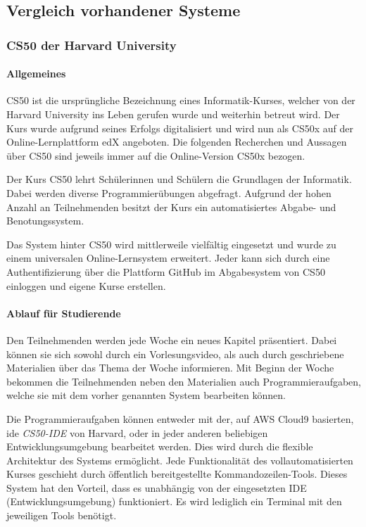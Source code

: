 \subsection{Vergleich vorhandener Systeme}
\subsubsection{CS50 der Harvard University}
\paragraph{Allgemeines}
CS50 ist die ursprüngliche Bezeichnung eines Informatik-Kurses, welcher von der
Harvard University ins Leben gerufen wurde und weiterhin betreut wird. Der Kurs
wurde aufgrund seines Erfolgs digitalisiert und wird nun als CS50x auf der
Online-Lernplattform edX angeboten. Die folgenden Recherchen und Aussagen über
CS50 sind jeweils immer auf die Online-Version CS50x bezogen.

Der Kurs CS50 lehrt Schülerinnen und Schülern die Grundlagen der Informatik.
Dabei werden diverse Programmierübungen abgefragt. Aufgrund der hohen Anzahl an
Teilnehmenden besitzt der Kurs ein automatisiertes Abgabe- und Benotungssystem.

Das System hinter CS50 wird mittlerweile vielfältig eingesetzt und wurde zu
einem universalen Online-Lernsystem erweitert. Jeder kann sich durch eine
Authentifizierung über die Plattform GitHub im Abgabesystem von CS50 einloggen
und eigene Kurse erstellen. \parencite{cs50}

\paragraph{Ablauf für Studierende}
Den Teilnehmenden werden jede Woche ein neues Kapitel präsentiert. Dabei können
sie sich sowohl durch ein Vorlesungsvideo, als auch durch geschriebene
Materialien über das Thema der Woche informieren. Mit Beginn der Woche bekommen
die Teilnehmenden neben den Materialien auch Programmieraufgaben, welche sie mit
dem vorher genannten System bearbeiten können. \parencite{cs50-edx}

Die Programmieraufgaben können entweder mit der, auf AWS Cloud9 basierten,
\ac{ide} \emph{CS50-IDE} von Harvard, oder in jeder anderen beliebigen
Entwicklungsumgebung bearbeitet werden. Dies wird durch die flexible Architektur
des Systems ermöglicht. Jede Funktionalität des vollautomatisierten Kurses
geschieht durch öffentlich bereitgestellte Kommandozeilen-Tools. Dieses System
hat den Vorteil, dass es unabhängig von der eingesetzten IDE
(Entwicklungsumgebung) funktioniert. Es wird lediglich ein Terminal mit den
jeweiligen Tools benötigt. \parencite{cs50-ide}

